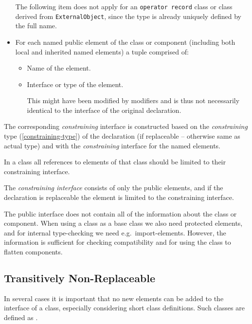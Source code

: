 \begin{itemize}
  The following item does not apply for an \lstinline!operator record! class or class derived from \lstinline!ExternalObject!, since the type is already uniquely defined by the full name.
\item
  For each named public element of the class or component (including
  both local and inherited named elements) a tuple comprised of:
  \begin{itemize}
  \item
    Name of the element.
  \item
    Interface or type of the element.
    \begin{nonnormative}
    This might have been modified by modifiers and is thus not necessarily identical to the interface of the original declaration.
    \end{nonnormative}
  \end{itemize}
\end{itemize}

The corresponding \emph{constraining} interface is constructed based on the \emph{constraining} type (\cref{constraining-type}) of the declaration (if replaceable -- otherwise same as actual
type) and with the \emph{constraining} interface for the named elements.

In a class all references to elements of that class should be limited to their constraining interface.

\begin{nonnormative}
The \emph{constraining interface} consists of only the public elements, and if the declaration is replaceable the element is limited to the constraining interface.
\end{nonnormative}

\begin{nonnormative}
The public interface does not contain all of the information about the class or component.
When using a class as a base class we also need protected elements, and for internal type-checking we need e.g.\ import-elements.
However, the information is sufficient for checking compatibility and for using the class to flatten components.
\end{nonnormative}

\subsection{Transitively Non-Replaceable}\label{transitively-non-replaceable}

\begin{nonnormative}
In several cases it is important that no new elements can be added to the interface of a class, especially considering short class definitions.
Such classes are defined as .
\end{nonnormative}

